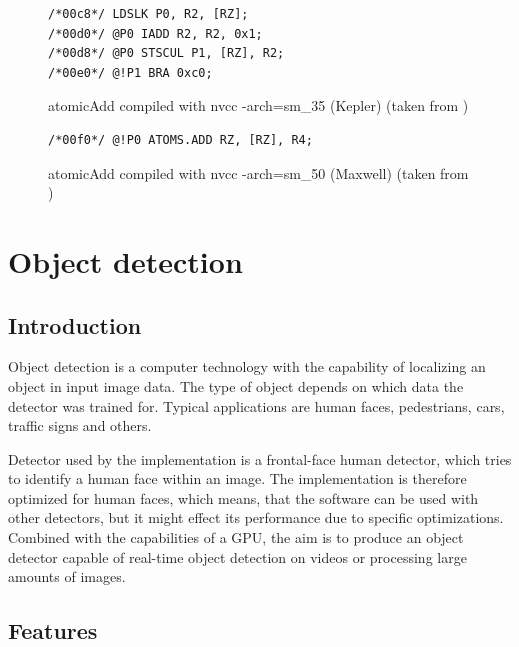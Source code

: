 \begin{figure}
\begin{verbatim}
/*00c8*/ LDSLK P0, R2, [RZ];                          
/*00d0*/ @P0 IADD R2, R2, 0x1;                            
/*00d8*/ @P0 STSCUL P1, [RZ], R2;                         
/*00e0*/ @!P1 BRA 0xc0;                                   
\end{verbatim}
\caption{atomicAdd compiled with nvcc -arch=sm\_35 (Kepler) (taken from \cite{first-experience-maxwell})}
\label{code:atomic-add-kepler}
\end{figure}

\begin{figure}
\begin{verbatim}
/*00f0*/ @!P0 ATOMS.ADD RZ, [RZ], R4;                                 
\end{verbatim}
\caption{atomicAdd compiled with nvcc -arch=sm\_50 (Maxwell) (taken from \cite{first-experience-maxwell})} 
\label{code:atomic-add-maxwell}
\end{figure}

\chapter{Object detection}

\section{Introduction}

Object detection is a computer technology with the capability of localizing an object in input image data. The type of object depends on which data the detector was trained for. Typical applications are human faces, pedestrians, cars, traffic signs and others.

Detector used by the implementation is a frontal-face human detector, which tries to identify a human face within an image. The implementation is therefore optimized for human faces, which means, that the software can be used with other detectors, but it might effect its performance due to specific optimizations. Combined with the capabilities of a GPU, the aim is to produce an object detector capable of real-time object detection on videos or processing large amounts of images.

\section{Features}

